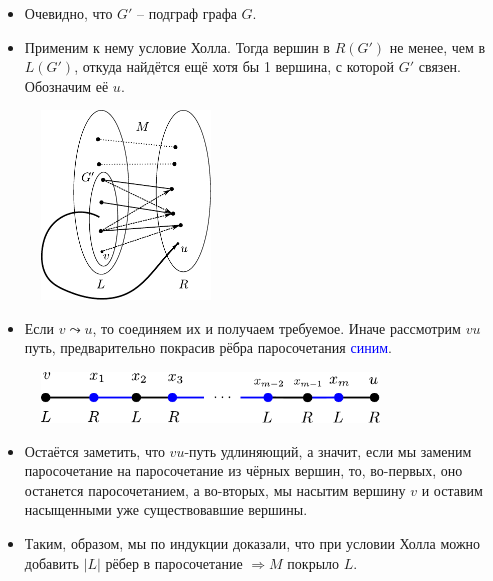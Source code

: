 \begin{frame}[t]
    \begin{itemize}
        \item Очевидно, что $G'$ -- подграф графа $G$.
        \item Применим к нему условие Холла. Тогда вершин в  $R(G')$ не менее, чем в $L(G')$, откуда найдётся ещё хотя бы 1 вершина, с которой $G'$ связен. Обозначим её $u$.
    \end{itemize}

            \begin{figure}[h]
                \centering
                \includegraphics[width=0.4\textwidth]{images/connectivity_hall}
                \label{fig:connectivity_hall}
            \end{figure}
    
\end{frame}

\begin{frame}[t]
    \begin{itemize}
        \item Если $v \leadsto u$, то соединяем их и получаем требуемое. Иначе рассмотрим $vu$ путь, предварительно покрасив рёбра паросочетания \textcolor{blue}{синим}.
    \end{itemize}

    \begin{figure}[h]
        \centering
        \includegraphics[width=0.8\textwidth]{images/longerway}
        \label{fig:longerway}
    \end{figure}

    \begin{itemize}
        \item Остаётся заметить, что $vu$-путь удлиняющий, а значит, если мы заменим паросочетание на паросочетание из чёрных вершин, то, во-первых, оно останется паросочетанием, а во-вторых, мы насытим вершину $v$ и оставим насыщенными уже существовавшие вершины.
        \item Таким, образом, мы по индукции доказали, что при условии Холла можно добавить $|L|$ рёбер в паросочетание $ \Rightarrow M$ покрыло $L$. 
            \hfill \qedsymbol{}
    \end{itemize}
\end{frame}
